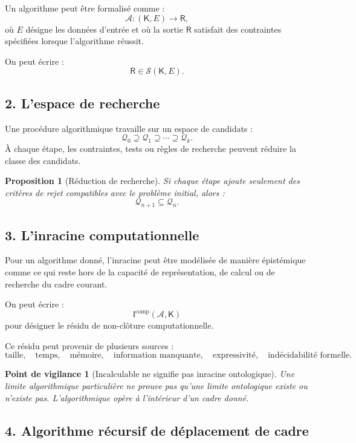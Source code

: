 \documentclass[11pt,a4paper]{article}
\newtheorem{proposition}{Proposition}[section]
\newtheorem{warning}{Point de vigilance}[section]
\newcommand{\Rac}{\mathsf{R}}
\newcommand{\Inrac}{\mathsf{I}}
\newcommand{\Cadre}{\mathsf{K}}
\newcommand{\Sol}{\mathcal{S}}
\begin{document}
Un algorithme peut être formalisé comme :
\[
\mathcal A:(\Cadre,E)\longrightarrow\Rac,
\]
où \(E\) désigne les données d'entrée et où la sortie \(\Rac\) satisfait des
contraintes spécifiées lorsque l'algorithme réussit.

On peut écrire :
\[
\Rac\in\Sol(\Cadre,E).
\]

\subsection{2. L'espace de recherche}

Une procédure algorithmique travaille sur un espace de candidats :
\[
\mathcal Q_0\supseteq\mathcal Q_1\supseteq\cdots\supseteq\mathcal Q_k.
\]
À chaque étape, les contraintes, tests ou règles de recherche peuvent réduire
la classe des candidats.

\begin{proposition}[Réduction de recherche]
Si chaque étape ajoute seulement des critères de rejet compatibles avec le
problème initial, alors :
\[
\mathcal Q_{n+1}\subseteq\mathcal Q_n.
\]
\end{proposition}

\subsection{3. L'inracine computationnelle}

Pour un algorithme donné, l'inracine peut être modélisée de manière
épistémique comme ce qui reste hors de la capacité de représentation, de
calcul ou de recherche du cadre courant.

On peut écrire :
\[
\Inrac^{\mathrm{comp}}(\mathcal A,\Cadre)
\]
pour désigner le résidu de non-clôture computationnelle.

Ce résidu peut provenir de plusieurs sources :
\[
\text{taille},\quad
\text{temps},\quad
\text{mémoire},\quad
\text{information manquante},\quad
\text{expressivité},\quad
\text{indécidabilité formelle}.
\]

\begin{warning}[Incalculable ne signifie pas inracine ontologique]
Une limite algorithmique particulière ne prouve pas qu'une limite ontologique
existe ou n'existe pas. L'algorithmique opère à l'intérieur d'un cadre donné.
\end{warning}

\subsection{4. Algorithme récursif de déplacement de cadre}
\end{document}
